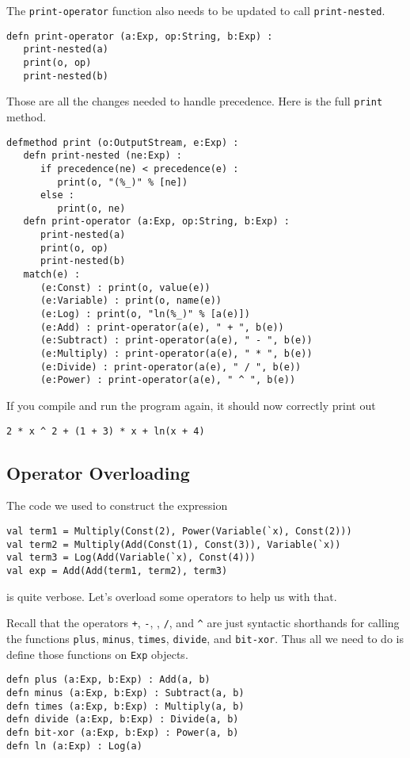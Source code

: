 \documentclass[10pt,oneside]{book}
\begin{document}
The \texttt{\frenchspacing print-operator} function also needs to be updated to call \texttt{\frenchspacing print-nested}.
\begin{lstlisting}
defn print-operator (a:Exp, op:String, b:Exp) :
   print-nested(a)
   print(o, op)
   print-nested(b)
\end{lstlisting}

Those are all the changes needed to handle precedence. Here is the full \texttt{\frenchspacing print} method. 
\begin{lstlisting}
defmethod print (o:OutputStream, e:Exp) :
   defn print-nested (ne:Exp) :
      if precedence(ne) < precedence(e) :
         print(o, "(%_)" % [ne])
      else :
         print(o, ne)
   defn print-operator (a:Exp, op:String, b:Exp) :
      print-nested(a)
      print(o, op)
      print-nested(b)
   match(e) :
      (e:Const) : print(o, value(e))
      (e:Variable) : print(o, name(e))
      (e:Log) : print(o, "ln(%_)" % [a(e)])
      (e:Add) : print-operator(a(e), " + ", b(e))
      (e:Subtract) : print-operator(a(e), " - ", b(e))
      (e:Multiply) : print-operator(a(e), " * ", b(e))
      (e:Divide) : print-operator(a(e), " / ", b(e))
      (e:Power) : print-operator(a(e), " ^ ", b(e))
\end{lstlisting}

If you compile and run the program again, it should now correctly print out
\begin{lstlisting}
2 * x ^ 2 + (1 + 3) * x + ln(x + 4)
\end{lstlisting}

\subsection*{Operator Overloading}
The code we used to construct the expression
\begin{lstlisting}
val term1 = Multiply(Const(2), Power(Variable(`x), Const(2)))
val term2 = Multiply(Add(Const(1), Const(3)), Variable(`x))
val term3 = Log(Add(Variable(`x), Const(4)))
val exp = Add(Add(term1, term2), term3)
\end{lstlisting}
is quite verbose. Let's overload some operators to help us with that. 

Recall that the operators \texttt{\frenchspacing +}, \texttt{\frenchspacing -}, \texttt{\frenchspacing *}, \texttt{\frenchspacing /}, and \texttt{\frenchspacing \^} are just syntactic shorthands for calling the functions \texttt{\frenchspacing plus}, \texttt{\frenchspacing minus}, \texttt{\frenchspacing times}, \texttt{\frenchspacing divide}, and \texttt{\frenchspacing bit-xor}. Thus all we need to do is define those functions on \texttt{\frenchspacing Exp} objects.
\begin{lstlisting}
defn plus (a:Exp, b:Exp) : Add(a, b)
defn minus (a:Exp, b:Exp) : Subtract(a, b)
defn times (a:Exp, b:Exp) : Multiply(a, b)
defn divide (a:Exp, b:Exp) : Divide(a, b)
defn bit-xor (a:Exp, b:Exp) : Power(a, b)
defn ln (a:Exp) : Log(a)
\end{lstlisting}
\end{document}
